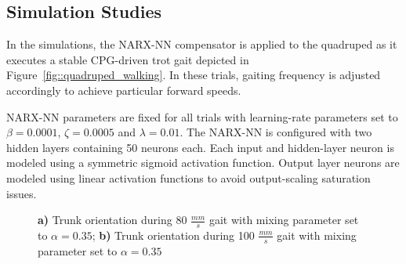 \subsection{Simulation Studies}


In the simulations, the NARX-NN compensator is applied to the quadruped as it executes a stable CPG-driven trot gait depicted in  Figure~\ref{fig::quadruped_walking}. In these trials, gaiting frequency is adjusted accordingly to achieve particular forward speeds.

NARX-NN parameters are fixed for all trials with learning-rate  parameters set to $\beta=0.0001$, $\zeta=0.0005$ and $\lambda = 0.01$. The NARX-NN is configured with two hidden layers containing 50 neurons each. Each input and hidden-layer neuron is modeled using a symmetric sigmoid activation function. Output layer neurons are modeled using linear activation functions to avoid output-scaling saturation issues. %

\begin{figure}[b!]
	\centering
	\begin{subfigure}{0.475\textwidth}
		\centering
		\caption{ }
	\end{subfigure}
	\begin{subfigure}{0.475\textwidth}
		\centering
		\caption{ } 
	\end{subfigure}
	\caption{ 
		\textbf{a)} Trunk orientation during 80 $\frac{mm}{s}$ gait with mixing parameter set to $\alpha = 0.35$;
		\textbf{b)} Trunk orientation during 100 $\frac{mm}{s}$ gait with mixing parameter set to $\alpha = 0.35$
	}
	\label{fig::fast}
	\vspace{-3mm}
\end{figure}

